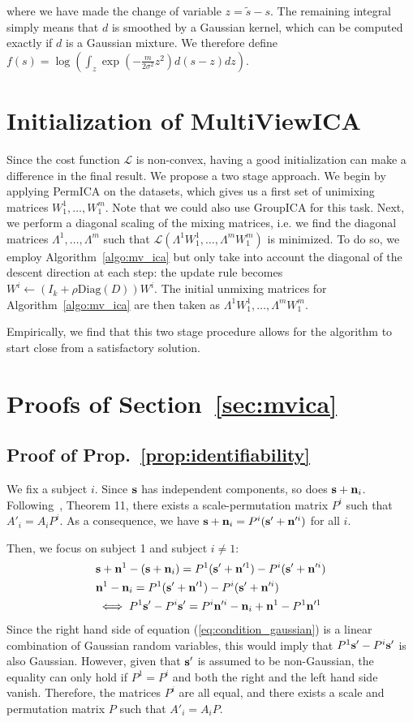 \documentclass[12pt]{report}
\begin{document}
where we have made the change of variable $z=\tilde{s}-s$. The remaining integral simply means that $d$ is smoothed by a Gaussian kernel, which can be computed exactly if $d$ is a Gaussian mixture. We therefore define $f(s) = \log \left(\int_z \exp \left(-\frac{m}{2\sigma^2} z^2 \right) d(s-z) dz\right)$.
\section{Initialization of MultiViewICA}
\label{sec:app_init}
Since the cost function $\mathcal{L}$ is non-convex, having a good initialization can make a difference in the final result.
% 
We propose a two stage approach.
% 
We begin by applying PermICA on the datasets, which gives us a first set of unimixing matrices $W_1^1, \dots, W_1^m$.
% 
Note that we could also use GroupICA for this task.
% 
Next, we perform a diagonal scaling of the mixing matrices, i.e. we find the diagonal matrices $\Lambda^1, \dots, \Lambda^m$ such that $\mathcal{L}(\Lambda^1W_1^1, \dots, \Lambda^mW_1^m)$ is minimized.
% 
To do so, we employ Algorithm~\ref{algo:mv_ica} but only take into account the diagonal of the descent direction at each step: the update rule becomes $W^i \leftarrow (I_k + \rho \text{Diag}(D))W^i$.
% 
The initial unmixing matrices for Algorithm~\ref{algo:mv_ica} are then taken as $\Lambda^1W_1^1, \dots, \Lambda^mW_1^m$.

Empirically, we find that this two stage procedure allows for the algorithm to start close from a satisfactory solution.
\section{Proofs of Section~\ref{sec:mvica}}
\label{sec:app_proofs}
\subsection{Proof of Prop.~\ref{prop:identifiability}}
We fix a subject $i$. Since $\mathbf{s}$ has independent components, so does $\mathbf{s} + \mathbf{n}_i$. Following~\cite{comon1994independent},
Theorem 11, there exists a scale-permutation matrix $P^i$ such that $A'_i =
A_iP^i$. As a consequence, we have $\mathbf{s}  + \mathbf{n}_i = P^i(\mathbf{s}' + \mathbf{n}'^i)$ for all
$i$.

Then, we focus on subject 1 and subject $i \neq 1$:
\begin{align}
  &\mathbf{s} + \mathbf{n}^1 - (\mathbf{s} + \mathbf{n}_i) = P^1(\mathbf{s}' + \mathbf{n}'^1) - P^i(\mathbf{s}' + \mathbf{n}'^i)\\
  &\mathbf{n}^1 - \mathbf{n}_i = P^1(\mathbf{s}' + \mathbf{n}'^1) - P^i(\mathbf{s}' + \mathbf{n}'^i)\\
  &\iff P^1\mathbf{s}' - P^i\mathbf{s}' = P^i \mathbf{n}'^i - \mathbf{n}_i + \mathbf{n}^1 - P^1 \mathbf{n}'^1 \label{eq:condition_gaussian}
\end{align}
Since the right hand side of equation (\ref{eq:condition_gaussian}) is a linear combination of Gaussian random variables, this would imply that $P^1\mathbf{s}' - P^i\mathbf{s}'$ is also Gaussian. However, given that $\mathbf{s}'$ is assumed to be non-Gaussian, the equality can only hold if $P^1
= P^i$ and both the right and the left hand side vanish.
Therefore, the matrices $P^i$ are all equal, and there exists a scale and permutation matrix $P$ such that $A'_i = A_iP$.
\end{document}
